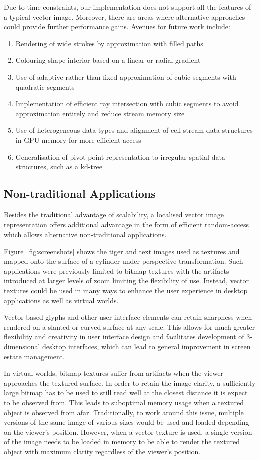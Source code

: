 \documentclass[11pt,a4paper,twoside]{article}
\begin{document}
Due to time constraints, our implementation does not support all the features of a typical vector image. Moreover, there are areas where alternative approaches could provide further performance gains. Avenues for future work include:

\begin {enumerate}
\item
Rendering of wide strokes by approximation with filled paths
\item
Colouring shape interior based on a linear or radial gradient
\item
Use of adaptive rather than fixed approximation of cubic segments with quadratic segments
\item
Implementation of efficient ray intersection with cubic segments to avoid approximation entirely and reduce stream memory size
\item
Use of heterogeneous data types and alignment of cell stream data structures in GPU memory for more efficient access
\item
Generalisation of pivot-point representation to irregular spatial data structures, such as a kd-tree
\end {enumerate}


\subsection {Non-traditional Applications}
Besides the traditional advantage of scalability, a localised vector image representation offers additional advantage in the form of efficient random-access which allows alternative non-traditional applications.

Figure~\ref{fig:screenshots} shows the tiger and text images used as textures and mapped onto the surface of a cylinder under perspective transformation. Such applications were previously limited to bitmap textures with the artifacts introduced at larger levels of zoom limiting the flexibility of use. Instead, vector textures could be used in many ways to enhance the user experience in desktop applications as well as virtual worlds.

Vector-based glyphs and other user interface elements can retain sharpness when rendered on a slanted or curved surface at any scale. This allows for much greater flexibility and creativity in user interface design and facilitates development of 3-dimensional desktop interfaces, which can lead to general improvement in screen estate management.

In virtual worlds, bitmap textures suffer from artifacts when the viewer approaches the textured surface. In order to retain the image clarity, a sufficiently large bitmap has to be used to still read well at the closest distance it is expect to be observed from. This leads to suboptimal memory usage when a textured object is observed from afar. Traditionally, to work around this issue, multiple versions of the same image of various sizes would be used and loaded depending on the viewer's position. However, when a vector texture is used, a single version of the image needs to be loaded in memory to be able to render the textured object with maximum clarity regardless of the viewer's position.
\end{document}
